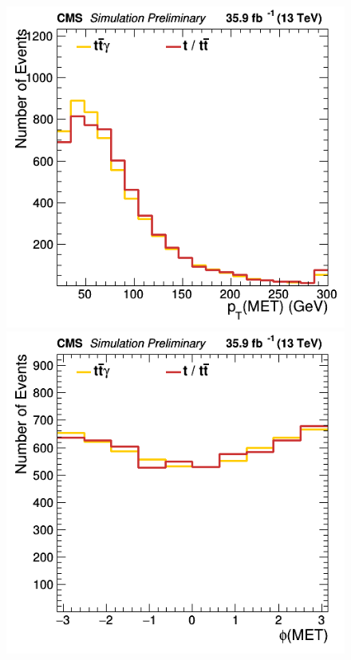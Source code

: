 \documentclass[11pt]{scrartcl}
\begin{document}
	\begin{figure}[H]
	\centering
	\begin{minipage}{.5\textwidth}
	  \centering
	  \includegraphics[width=0.70\linewidth]{figures/Select1/MET_pt.png}
	\end{minipage}%
	\begin{minipage}{.5\textwidth}
	  \centering
	  \includegraphics[width=0.70\linewidth]{figures/Select1/MET_phi.png}
	\end{minipage}
	\end{figure}
	
\end{document}
